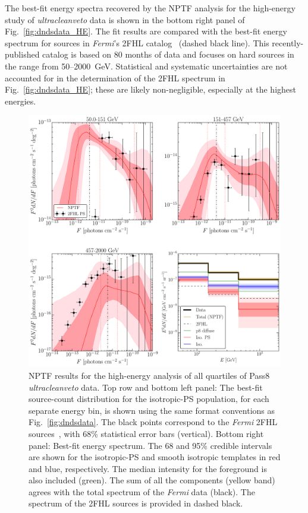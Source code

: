 The best-fit energy spectra recovered by the NPTF analysis for the high-energy study of  {\it ultracleanveto} data is shown in the bottom right panel of Fig.~\ref{fig:dndsdata_HE}.
The fit results are compared with the best-fit  energy spectrum for sources in \emph{Fermi}'s 2FHL catalog~\cite{Ackermann:2015uya} (dashed black line).  This recently-published catalog is based on 80 months of data and focuses on hard sources in the range from 50--2000~GeV.  Statistical and systematic uncertainties are not accounted for in the determination of the 2FHL spectrum in Fig.~\ref{fig:dndsdata_HE}; these are likely non-negligible, especially at the highest energies.
\begin{figure}[phtb] %
   \centering
   \includegraphics[width=\textwidth]{ch-igrb/plots/N128UHEp8-0K-SourceCounts-final-700-E15-p8-3br.pdf} 
   \caption{NPTF results for the high-energy analysis of all quartiles of Pass8 {\it ultracleanveto} data. Top row and bottom left panel:  The best-fit source-count distribution for the isotropic-PS population, for each separate energy bin, is shown using the same format conventions as Fig.~\ref{fig:dndsdata}.  The black points correspond to the \emph{Fermi} 2FHL sources~\cite{Ackermann:2015uya}, with 68\% statistical error bars (vertical).  Bottom right panel: Best-fit energy spectrum.  The 68 and 95\% credible intervals are shown for the isotropic-PS and smooth isotropic templates in red and blue, respectively.  The median intensity for the foreground is also included (green).  The sum of all the components (yellow band) agrees with the total spectrum of the \emph{Fermi} data (black).  The spectrum of the 2FHL sources is provided in dashed black.  %
}
\end{figure}
